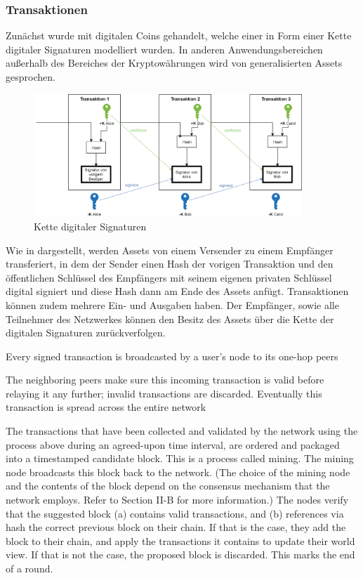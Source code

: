     \subsubsection{Transaktionen}
    \label{sec:sota_blockchain_trx}
	    Zunächst wurde mit digitalen Coins gehandelt, welche einer in Form einer Kette digitaler Signaturen modelliert wurden\cite{Nakamoto2008}.
	    In anderen Anwendungsbereichen außerhalb des Bereiches der Kryptowährungen wird von generalisierten Assets gesprochen.
	    \begin{figure}[H]
	    	\centering
	    	\includegraphics[width=0.9\textwidth]{graphics/transaction.png}
	    	\caption{Kette digitaler Signaturen}
	    	\label{fig:txio}
	    \end{figure}
    
	    Wie in  dargestellt, werden Assets von einem Versender zu einem Empfänger transferiert, in dem der Sender einen Hash der vorigen Transaktion und den öffentlichen Schlüssel des Empfängers mit seinem eigenen privaten Schlüssel digital signiert und diese Hash dann am Ende des Assets anfügt.
	    Transaktionen können zudem mehrere Ein- und Ausgaben haben\cite{Nakamoto2008}.
	    Der Empfänger, sowie alle Teilnehmer des Netzwerkes können den Besitz des Assets über die Kette der digitalen Signaturen zurückverfolgen\cite{Nakamoto2008}.
	    
	    Every signed transaction is broadcasted by a user’s node to its one-hop peers\cite{Christidis2016}
	    
	    The neighboring peers make sure this incoming transaction is valid before relaying it any further; invalid transactions are discarded. Eventually this transaction is spread across the entire network\cite{Christidis2016}
	    
	    The transactions that have been collected and validated by the network using the process above during an agreed-upon time interval, are ordered and packaged into a timestamped candidate block. This is a process called mining. The mining node broadcasts this block back to the network. (The choice of the mining node and the contents of the block depend on the consensus mechanism that the network employs. Refer to Section II-B for more information.)
	    The nodes verify that the suggested block (a) contains valid transactions, and (b) references via hash the correct previous block on their chain. If that is the case, they add the block to their chain, and apply the transactions it contains to update their world view. If that is not the case, the proposed block is discarded. This marks the end of a round.\cite{Christidis2016}
	    
